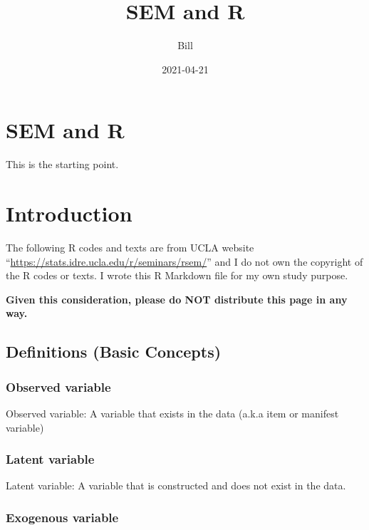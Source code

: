 \documentclass[]{book}
\title{SEM and R}
\author{Bill}
\date{2021-04-21}
\begin{document}
\maketitle

{
\setcounter{tocdepth}{1}
\tableofcontents
}
\hypertarget{sem-and-r}{%
\chapter{SEM and R}\label{sem-and-r}}

This is the starting point.

\hypertarget{intro}{%
\chapter{Introduction}\label{intro}}

The following R codes and texts are from UCLA website ``\url{https://stats.idre.ucla.edu/r/seminars/rsem/}'' and I do not own the copyright of the R codes or texts. I wrote this R Markdown file for my own study purpose.

\textbf{Given this consideration, please do NOT distribute this page in any way.}

\hypertarget{definitions-basic-concepts}{%
\section{Definitions (Basic Concepts)}\label{definitions-basic-concepts}}

\hypertarget{observed-variable}{%
\subsection{Observed variable}\label{observed-variable}}

Observed variable: A variable that exists in the data (a.k.a item or manifest variable)

\hypertarget{latent-variable}{%
\subsection{Latent variable}\label{latent-variable}}

Latent variable: A variable that is constructed and does not exist in the data.

\hypertarget{exogenous-variable}{%
\subsection{Exogenous variable}\label{exogenous-variable}}
\end{document}
